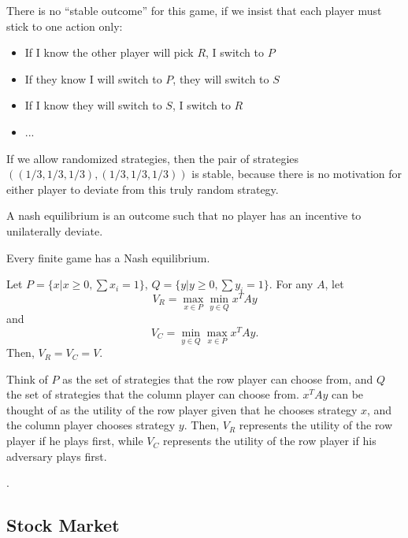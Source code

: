 There is no ``stable outcome'' for this game, if we insist that each player must stick to one action only:
\begin{itemize}
    \item If I know the other player will pick $R$, I switch to $P$
    \item If they know I will switch to $P$, they will switch to $S$
    \item If I know they will switch to $S$, I switch to $R$
    \item ...
\end{itemize}

If we allow randomized strategies, then the pair of strategies $((1/3, 1/3, 1/3), (1/3, 1/3, 1/3))$ is stable, because there is no motivation for either player to deviate from this truly random strategy. 

\begin{definition}

A \ac{nash equilibrium} is an outcome such that no player has an incentive to unilaterally deviate. 
\end{definition}

\begin{theorem}

Every finite game has a Nash equilibrium.
\end{theorem}

\begin{theorem}

Let $P=\{x | x\geq 0, \sum x_i=1\}$, $Q = \{y | y\geq 0, \sum y_i=1\}$. For any $A$, let
\[V_R = \max_{x\in P}\min_{y\in Q}x^TAy\]
and
\[V_C = \min_{y\in Q}\max_{x\in P}x^TAy.\]
Then, $V_R = V_C=V$. 
\end{theorem}

Think of $P$ as the set of strategies that the row player can choose from, and $Q$ the set of strategies that the column player can choose from. $x^TAy$ can be thought of as the utility of the row player given that he chooses strategy $x$, and the column player chooses strategy $y$. Then, $V_R$ represents the utility of the row player if he plays first, while $V_C$ represents the utility of the row player if his adversary plays first. 

.

\subsection{Stock Market}

